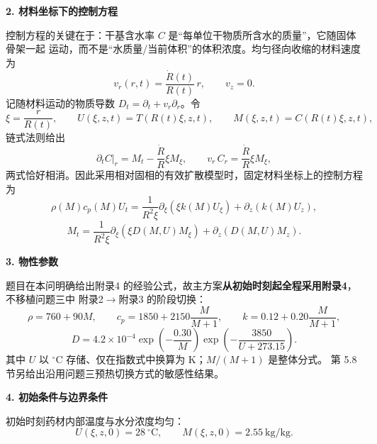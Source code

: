 \documentclass[12pt,a4paper]{ctexart}
\begin{document}
\textbf{2. 材料坐标下的控制方程}

控制方程的关键在于：干基含水率 $C$ 是“每单位干物质所含水的质量”，它随固体骨架一起
运动，而不是“水质量/当前体积”的体积浓度。均匀径向收缩的材料速度为
\begin{equation}
v_r(r,t)=\frac{\dot R(t)}{R(t)}\,r,\qquad v_z=0 .
\label{eq:p4velocity}
\end{equation}
记随材料运动的物质导数 $D_t=\partial_t+v_r\partial_r$。令
\begin{equation}
\xi=\frac{r}{R(t)},\qquad U(\xi,z,t)=T(R(t)\xi,z,t),\qquad M(\xi,z,t)=C(R(t)\xi,z,t),
\label{eq:p4xi}
\end{equation}
链式法则给出
\begin{equation}
\left.\partial_t C\right|_r=M_t-\frac{\dot R}{R}\xi M_\xi ,
\qquad v_r\,C_r=\frac{\dot R}{R}\xi M_\xi ,
\label{eq:p4cancel}
\end{equation}
两式恰好相消。因此采用相对固相的有效扩散模型时，固定材料坐标上的控制方程为
\begin{equation}
\rho(M)c_p(M)U_t
=\frac{1}{R^{2}\xi}\partial_\xi\!\left(\xi k(M)U_\xi\right)
+\partial_z\!\left(k(M)U_z\right),
\label{eq:p4heat}
\end{equation}
\begin{equation}
M_t
=\frac{1}{R^{2}\xi}\partial_\xi\!\left(\xi D(M,U)M_\xi\right)
+\partial_z\!\left(D(M,U)M_z\right).
\label{eq:p4mass}
\end{equation}



\textbf{3. 物性参数}

题目在本问明确给出附录4 的经验公式，故主方案\textbf{从初始时刻起全程采用附录4}，不移植问题三中
附录2$\to$附录3 的阶段切换：
\begin{equation}
\rho=760+90M,\qquad
c_p=1850+2150\frac{M}{M+1},\qquad
k=0.12+0.20\frac{M}{M+1},
\label{eq:p4props}
\end{equation}
\begin{equation}
D=4.2\times10^{-4}\exp\!\left(-\frac{0.30}{M}\right)
\exp\!\left(-\frac{3850}{U+273.15}\right).
\label{eq:p4D}
\end{equation}
其中 $U$ 以 $^\circ\mathrm{C}$ 存储、仅在指数式中换算为 $\mathrm{K}$；$M/(M+1)$ 是整体分式。
第 5.8 节另给出沿用问题三预热切换方式的敏感性结果。

\textbf{4. 初始条件与边界条件}

初始时刻药材内部温度与水分浓度均匀：
\begin{equation}
U(\xi,z,0)=28\ ^\circ\mathrm{C},\qquad M(\xi,z,0)=2.55\ \mathrm{kg/kg}.
\label{eq:p4ic}
\end{equation}
\end{document}
